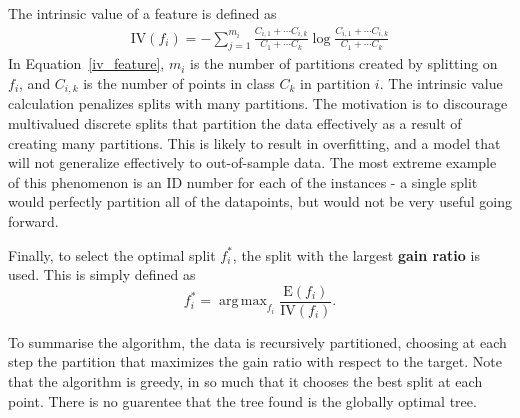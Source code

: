 \documentclass{amsart}
\DeclareMathOperator*{\argmax}{arg\,max}
\begin{document}
    The intrinsic value of a feature is defined as
    \begin{align}
        \textrm{IV}(f_i) = -\sum_{j=1}^{m_i} \frac{C_{i, 1} + \cdots C_{i, k}}
        {C_{1} + \cdots C_{k}} \log  \frac{C_{i, 1} + \cdots C_{i, k}}
        {C_{1} + \cdots C_{k}}
    \label{iv_feature}
    \end{align}
    In Equation~\ref{iv_feature}, $m_i$ is the number of partitions created by splitting
    on $f_i$, and $C_{i, k}$ is the number of points in class $C_k$ in partition $i$.
    The intrinsic value calculation penalizes splits with many partitions. The
    motivation is to discourage multivalued discrete splits that
    partition the data effectively as a result of creating many partitions. This is
    likely to result in overfitting, and a model that will not generalize effectively
    to out-of-sample data. The most extreme example of this phenomenon is an ID number
    for each of the instances - a single split would perfectly partition all of the
    datapoints, but would not be very useful going forward.

    Finally, to select the optimal split $f_i^*$, the split with the largest \textbf{gain ratio}
    is used. This is simply defined as
    \[
        f_i^* = \argmax_{f_i} \frac{\textrm{E}(f_i)}{\textrm{IV}(f_i)}.
    \]

    To summarise the algorithm, the data is recursively partitioned, choosing at each step
    the partition that maximizes the gain ratio with respect to the target. Note that
    the algorithm is greedy, in so much that it chooses the best split at each point.
    There is no guarentee that the tree found is the globally optimal tree.
\end{document}
